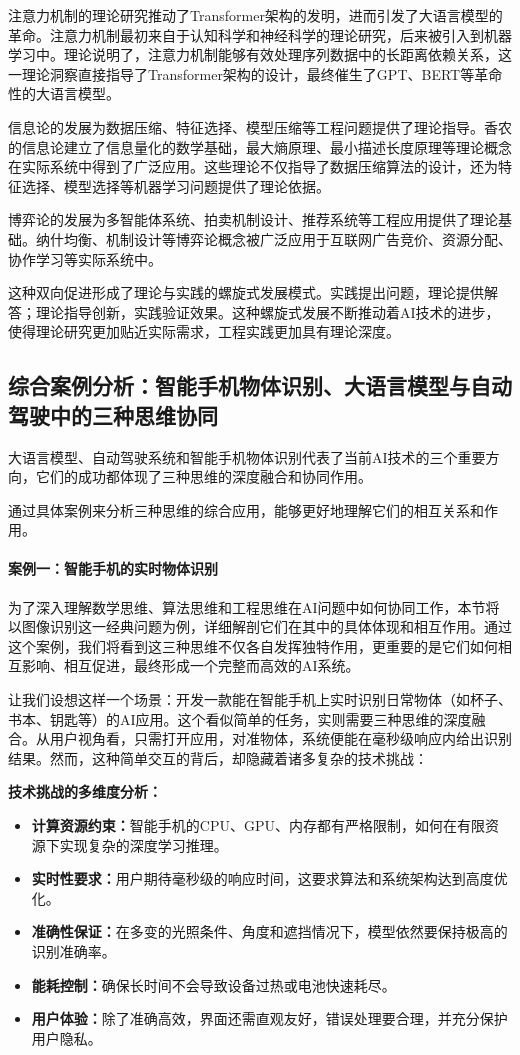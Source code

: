注意力机制的理论研究推动了Transformer架构的发明，进而引发了大语言模型的革命。注意力机制最初来自于认知科学和神经科学的理论研究，后来被引入到机器学习中。理论说明了，注意力机制能够有效处理序列数据中的长距离依赖关系，这一理论洞察直接指导了Transformer架构的设计，最终催生了GPT、BERT等革命性的大语言模型。

信息论的发展为数据压缩、特征选择、模型压缩等工程问题提供了理论指导。香农的信息论建立了信息量化的数学基础，最大熵原理、最小描述长度原理等理论概念在实际系统中得到了广泛应用。这些理论不仅指导了数据压缩算法的设计，还为特征选择、模型选择等机器学习问题提供了理论依据。

博弈论的发展为多智能体系统、拍卖机制设计、推荐系统等工程应用提供了理论基础。纳什均衡、机制设计等博弈论概念被广泛应用于互联网广告竞价、资源分配、协作学习等实际系统中。

这种双向促进形成了理论与实践的螺旋式发展模式。实践提出问题，理论提供解答；理论指导创新，实践验证效果。这种螺旋式发展不断推动着AI技术的进步，使得理论研究更加贴近实际需求，工程实践更加具有理论深度。

\subsection{综合案例分析：智能手机物体识别、大语言模型与自动驾驶中的三种思维协同}
大语言模型、自动驾驶系统和智能手机物体识别代表了当前AI技术的三个重要方向，它们的成功都体现了三种思维的深度融合和协同作用。

通过具体案例来分析三种思维的综合应用，能够更好地理解它们的相互关系和作用。

\paragraph{案例一：智能手机的实时物体识别}
为了深入理解数学思维、算法思维和工程思维在AI问题中如何协同工作，本节将以图像识别这一经典问题为例，详细解剖它们在其中的具体体现和相互作用。通过这个案例，我们将看到这三种思维不仅各自发挥独特作用，更重要的是它们如何相互影响、相互促进，最终形成一个完整而高效的AI系统。

让我们设想这样一个场景：开发一款能在智能手机上实时识别日常物体（如杯子、书本、钥匙等）的AI应用。这个看似简单的任务，实则需要三种思维的深度融合。从用户视角看，只需打开应用，对准物体，系统便能在毫秒级响应内给出识别结果。然而，这种简单交互的背后，却隐藏着诸多复杂的技术挑战：

\textbf{技术挑战的多维度分析：}
\begin{itemize}
\item \textbf{计算资源约束：}智能手机的CPU、GPU、内存都有严格限制，如何在有限资源下实现复杂的深度学习推理。
\item \textbf{实时性要求：}用户期待毫秒级的响应时间，这要求算法和系统架构达到高度优化。
\item \textbf{准确性保证：}在多变的光照条件、角度和遮挡情况下，模型依然要保持极高的识别准确率。
\item \textbf{能耗控制：}确保长时间不会导致设备过热或电池快速耗尽。
\item \textbf{用户体验：}除了准确高效，界面还需直观友好，错误处理要合理，并充分保护用户隐私。
\end{itemize}

